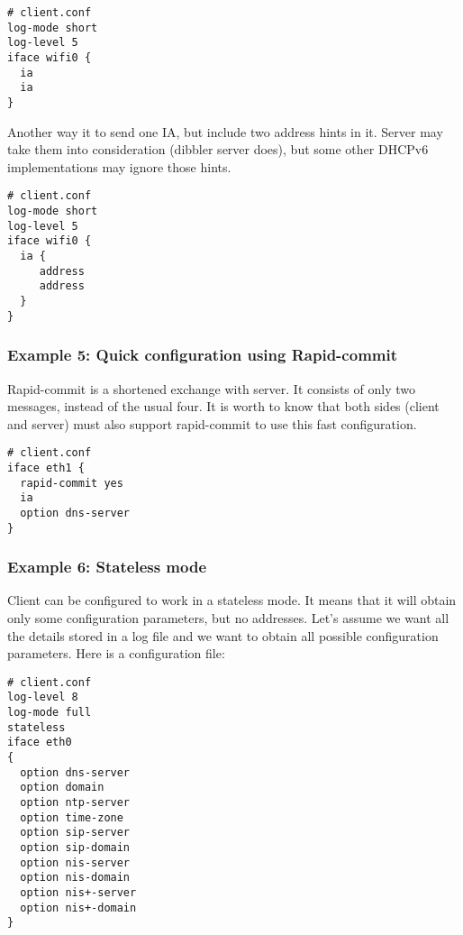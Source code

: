 \begin{lstlisting}
# client.conf
log-mode short
log-level 5
iface wifi0 {
  ia
  ia
}
\end{lstlisting}

Another way it to send one IA, but include two address hints in
it. Server may take them into consideration (dibbler server does), but
some other DHCPv6 implementations may ignore those hints.

\begin{lstlisting}
# client.conf
log-mode short
log-level 5
iface wifi0 {
  ia {
     address
     address
  }
}
\end{lstlisting}

\subsubsection{Example 5: Quick configuration using Rapid-commit}
Rapid-commit is a shortened exchange with server. It consists of only
two messages, instead of the usual four. It is worth to know that both sides (client
and server) must also support rapid-commit to use this fast
configuration.

\begin{lstlisting}
# client.conf
iface eth1 {
  rapid-commit yes
  ia
  option dns-server
}
\end{lstlisting}

\subsubsection{Example 6: Stateless mode}
Client can be configured to work in a stateless mode. It means that it
will obtain only some configuration parameters, but no
addresses. Let's assume we want all the details stored in a log file and
we want to obtain all possible configuration parameters. Here is a
configuration file:

\begin{lstlisting}
# client.conf
log-level 8
log-mode full
stateless
iface eth0
{
  option dns-server
  option domain
  option ntp-server
  option time-zone
  option sip-server
  option sip-domain
  option nis-server
  option nis-domain
  option nis+-server
  option nis+-domain
}
\end{lstlisting}

